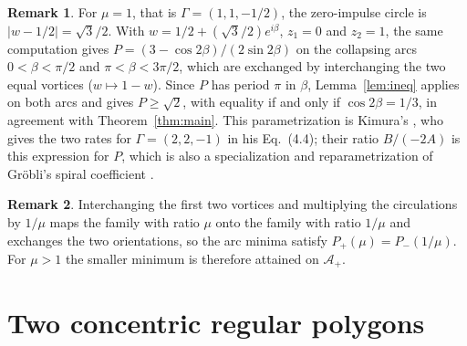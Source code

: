 \documentclass[11pt]{article}
\theoremstyle{definition}
\newtheorem{remark}{Remark}
\newcommand{\Ap}{\mathcal{A}_+}
\begin{document}
\begin{remark}\label{rem:equal}
For $\mu = 1$, that is $\Gamma = (1, 1, -1/2)$, the zero-impulse circle is $|w - 1/2| = \sqrt{3}/2$. With $w = 1/2 + (\sqrt{3}/2) e^{i\beta}$, $z_1 = 0$ and $z_2 = 1$, the same computation gives $P = (3 - \cos 2\beta)/(2\sin 2\beta)$ on the collapsing arcs $0 < \beta < \pi/2$ and $\pi < \beta < 3\pi/2$, which are exchanged by interchanging the two equal vortices ($w \mapsto 1 - w$). Since $P$ has period $\pi$ in $\beta$, Lemma~\ref{lem:ineq} applies on both arcs and gives $P \ge \sqrt{2}$, with equality if and only if $\cos 2\beta = 1/3$, in agreement with Theorem~\ref{thm:main}. This parametrization is Kimura's \cite[Sect.~4]{kimura1987}, who gives the two rates for $\Gamma = (2, 2, -1)$ in his Eq.~(4.4); their ratio $B/(-2A)$ is this expression for $P$, which is also a specialization and reparametrization of Gr\"obli's spiral coefficient \cite[Sect.~10]{grobli1877}.
\end{remark}

\begin{remark}\label{rem:swap}
Interchanging the first two vortices and multiplying the circulations by $1/\mu$ maps the family with ratio $\mu$ onto the family with ratio $1/\mu$ and exchanges the two orientations, so the arc minima satisfy $P_+(\mu) = P_-(1/\mu)$. For $\mu > 1$ the smaller minimum is therefore attained on $\Ap$.
\end{remark}

\section{Two concentric regular polygons}\label{sec:rings}
\end{document}

